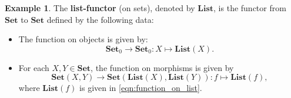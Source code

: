 \documentclass[a4paper,11pt, oneside,titlepage=false]{scrbook}
\theoremstyle{plain}
\theoremstyle{definition}
\newtheorem{exa}[thm]{Example}
\newcommand{\cfont}[1]{\ensuremath{\mathsf{#1}}}
\newcommand{\Catb}[1]{\mathbf{#1}}
\newcommand{\List}{\Catb{List}}
\newcommand{\SET}{\Catb{Set}}
\newcommand{\Ob}[1]{{#1}_0}
\newcommand{\CHom}[3]{{#1}(#2,#3)}
\newcommand{\Id}[1][]{\cfont{id}_{#1}}
\newcommand{\co}[2]{\ensuremath{#2 \circ #1}}
\begin{document}
\begin{exa} \label{example:functor_list} The \textbf{list-functor} (on sets), denoted by $\List$, is the functor from $\SET$ to $\SET$ defined by the following data:
\begin{itemize}
\item The function on objects is given by:
\[
\Ob{\SET}\to \Ob{\SET}: X\mapsto \List(X).
\]
\item For each $X,Y\in\SET$, the function on morphisms is given by
\[
\CHom{\SET}{X}{Y} \to \CHom{\SET}{\List(X)}{\List(Y)}: f\mapsto \List(f),
\]
where $\mathbf{List}(f)$ is given in \cref{eqn:function_on_list}.
\end{itemize}

\end{exa}
\end{document}
